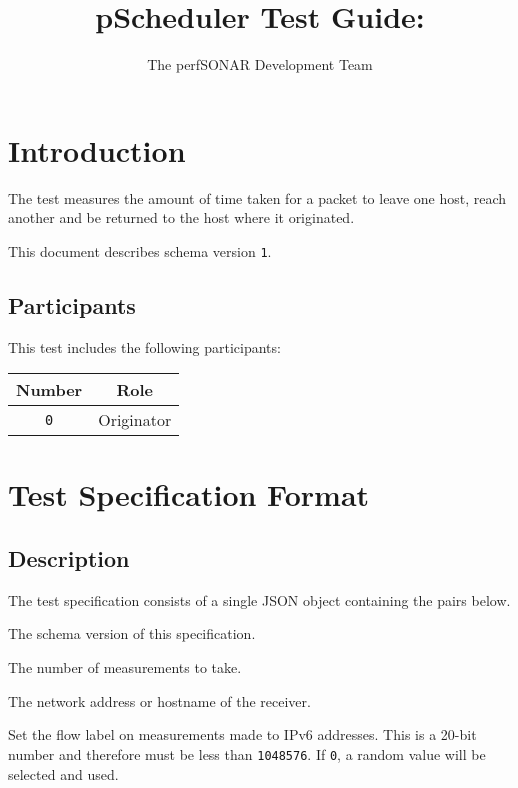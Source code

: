 \documentclass[10pt]{article}
\title{pScheduler Test Guide: {\it \testname}}
\author{The perfSONAR Development Team}
\begin{document}
\maketitle


%
%

\section{Introduction}

The {\tt \testname} test measures the amount of time taken for a
packet to leave one host, reach another and be returned to the host
where it originated.

This document describes schema version {\tt 1}.

\subsection{Participants}

This test includes the following participants:

\begin{center}
\begin{tabular}{|c|c|}
\hline
{\bf Number} & {\bf Role} \\
\hline
{\tt 0} & Originator \\
\hline
\end{tabular}
\end{center}



%
%

\section{Test Specification Format}

\subsection{Description}

The test specification consists of a single JSON object containing the
pairs below.  \seejson

 The schema version of this specification.

 The number of measurements to take.

 The network address or hostname of the receiver.

 Set the flow label on
measurements made to IPv6 addresses.  This is a 20-bit number and
therefore must be less than {\tt 1048576}. If {\tt 0}, a random value
will be selected and used.
\end{document}
